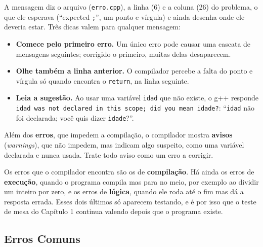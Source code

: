 A mensagem diz o arquivo (\texttt{erro.cpp}), a linha (6) e a coluna (26) do problema, o que ele esperava (``expected \texttt{\textquotesingle{};\textquotesingle{}}'', um ponto e vírgula) e ainda desenha onde ele deveria estar. Três dicas valem para qualquer mensagem:

\begin{itemize}
  \item \textbf{Comece pelo primeiro erro.} Um único erro pode causar uma cascata de mensagens seguintes; corrigido o primeiro, muitas delas desaparecem.
  \item \textbf{Olhe também a linha anterior.} O compilador percebe a falta do ponto e vírgula só quando encontra o \texttt{return}, na linha seguinte.
  \item \textbf{Leia a sugestão.} Ao usar uma variável \texttt{idad} que não existe, o g++ responde \texttt{\textquotesingle{}idad\textquotesingle{} was not declared in this scope; did you mean \textquotesingle{}idade\textquotesingle{}?}: ``\texttt{idad} não foi declarada; você quis dizer \texttt{idade}?''.
\end{itemize}

Além dos \textbf{erros}, que impedem a compilação, o compilador mostra \textbf{avisos} (\textit{warnings}), que não impedem, mas indicam algo suspeito, como uma variável declarada e nunca usada. Trate todo aviso como um erro a corrigir.

Os erros que o compilador encontra são os de \textbf{compilação}. Há ainda os erros de \textbf{execução}, quando o programa compila mas para no meio, por exemplo ao dividir um inteiro por zero, e os erros de \textbf{lógica}, quando ele roda até o fim mas dá a resposta errada. Esses dois últimos só aparecem testando, e é por isso que o teste de mesa do Capítulo 1 continua valendo depois que o programa existe.

\subsection{Erros Comuns}


